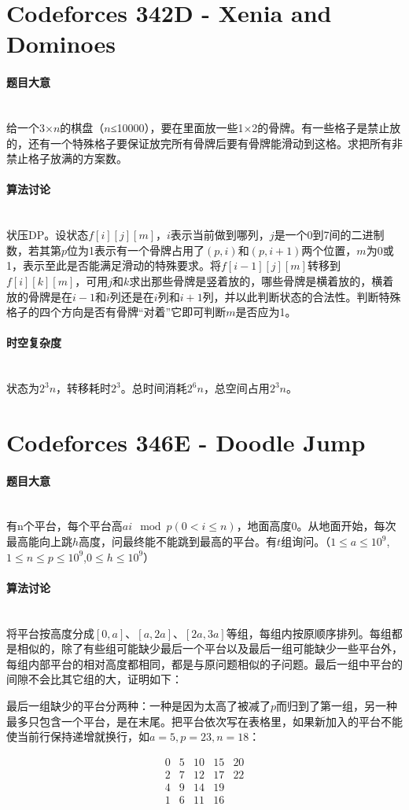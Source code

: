 \documentclass[UTF8]{ctexart}
\newcommand{\myparagraph}[1]{\paragraph{#1}\mbox{}\\}
\theoremstyle{nonumberplain}
\begin{document}
	\section{Codeforces 342D - Xenia and Dominoes}
	
		\myparagraph{题目大意}
		
			给一个3×$n$的棋盘（$n$≤10000），要在里面放一些1×2的骨牌。有一些格子是禁止放的，还有一个特殊格子要保证放完所有骨牌后要有骨牌能滑动到这格。求把所有非禁止格子放满的方案数。
		
		\myparagraph{算法讨论}
		
			状压DP。设状态$f[i][j][m]$，$i$表示当前做到哪列，$j$是一个0到7间的二进制数，若其第$p$位为1表示有一个骨牌占用了$(p,i)$和$(p,i+1)$两个位置，$m$为0或1，表示至此是否能满足滑动的特殊要求。将$f[i-1][j][m]$转移到$f[i][k][m]$，可用$j$和$k$求出那些骨牌是竖着放的，哪些骨牌是横着放的，横着放的骨牌是在$i-1$和$i$列还是在$i$列和$i+1$列，并以此判断状态的合法性。判断特殊格子的四个方向是否有骨牌“对着”它即可判断$m$是否应为1。
			
		
		\myparagraph{时空复杂度}
		
			状态为$2^3n$，转移耗时$2^3$。总时间消耗$2^6n$，总空间占用$2^3n$。
	
	\section{Codeforces 346E - Doodle Jump}
		
		\myparagraph{题目大意}
		
			有n个平台，每个平台高$ai \mod p (0<i \leq n)$，地面高度0。从地面开始，每次最高能向上跳$h$高度，问最终能不能跳到最高的平台。有$t$组询问。（$1 \leq a \leq 10^9$,$1 \leq n \leq p \leq 10^9$,$0 \leq h \leq 10^9$）
		
		\myparagraph{算法讨论}
		
			将平台按高度分成$[0,a]$、$[a,2a]$、$[2a,3a]$等组，每组内按原顺序排列。每组都是相似的，除了有些组可能缺少最后一个平台以及最后一组可能缺少一些平台外，每组内部平台的相对高度都相同，都是与原问题相似的子问题。最后一组中平台的间隙不会比其它组的大，证明如下：
			
			最后一组缺少的平台分两种：一种是因为太高了被减了$p$而归到了第一组，另一种最多只包含一个平台，是在末尾。把平台依次写在表格里，如果新加入的平台不能使当前行保持递增就换行，如$a=5,p=23,n=18$：
			
			$$\begin{array}{ccccc}
				0 & 5 & 10 & 15 & 20 \\
				2 & 7 & 12 & 17 & 22 \\
				4 & 9 & 14 & 19 & \\
				1 & 6 & 11 & 16 &
			\end{array}$$
			
\end{document}
